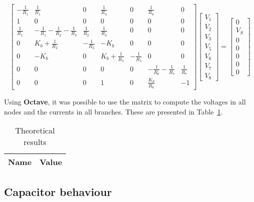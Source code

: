 \begin{equation}
  \begin{bmatrix}
    -\frac{1}{R_1} & \frac{1}{R_1} & 0 & \frac{1}{R_4} & 0 & \frac{1}{R_6} & 0 \\
    1 & 0 & 0 & 0 & 0 & 0 & 0 \\
    \frac{1}{R_1} & -\frac{1}{R_1}-\frac{1}{R_2}-\frac{1}{R_3} & \frac{1}{R_2} & \frac{1}{R_3} & 0 & 0 & 0 \\
    0 & K_b + \frac{1}{R_2} & -\frac{1}{R_2} & -K_b & 0 & 0 & 0 \\
    0 & -K_b & 0 & K_b+\frac{1}{R_5} & -\frac{1}{R_5} & 0 & 0 \\
    0 & 0 & 0 & 0 & 0 & -\frac{1}{R_6}-\frac{1}{R_7} & \frac{1}{R_7} \\
    0 & 0 & 0 & 1 & 0 & \frac{K_d}{R_6} & -1     
  \end{bmatrix}
  \begin{bmatrix}
    V_1 \\
    V_2 \\
    V_3 \\
    V_5 \\
    V_6 \\
    V_7 \\
    V_8
  \end{bmatrix}
  =
  \begin{bmatrix}
    0 \\
    V_S \\
    0 \\
    0 \\
    0 \\
    0 \\
    0
  \end{bmatrix}
\end{equation}

Using {\bf Octave}, it was possible to use the matrix to compute the voltages in all nodes and the currents in all branches. These are presented in Table~\ref{node_res}. 

\begin{table}[H]
  \centering
  \begin{tabular}{|c|c|}
    \hline
        {\bf Name} & {\bf Value} \\
        \hline
        \hline
        
        \hline
  \end{tabular}
  \caption{Theoretical results}
  \label{node_res}
\end{table}

\subsection{Capacitor behaviour}
\label{sec:Req}

